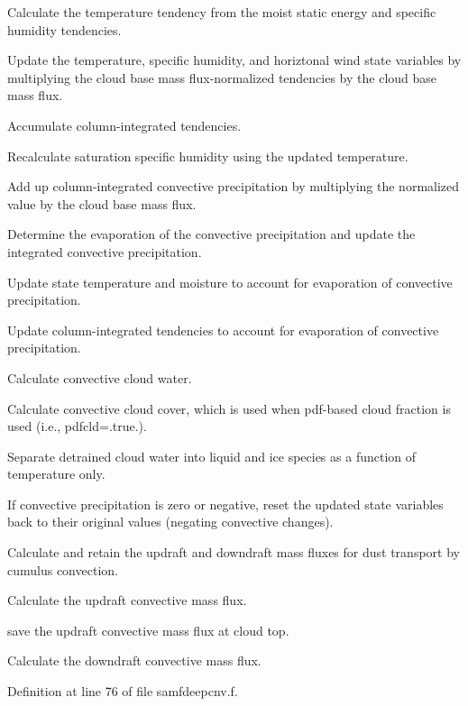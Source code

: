 \begin{DoxyItemize}
\item Calculate the temperature tendency from the moist static energy and specific humidity tendencies.
\item Update the temperature, specific humidity, and horiztonal wind state variables by multiplying the cloud base mass flux-\/normalized tendencies by the cloud base mass flux.
\item Accumulate column-\/integrated tendencies.
\item Recalculate saturation specific humidity using the updated temperature.
\item Add up column-\/integrated convective precipitation by multiplying the normalized value by the cloud base mass flux.
\item Determine the evaporation of the convective precipitation and update the integrated convective precipitation.
\item Update state temperature and moisture to account for evaporation of convective precipitation.
\item Update column-\/integrated tendencies to account for evaporation of convective precipitation.
\item Calculate convective cloud water.
\item Calculate convective cloud cover, which is used when pdf-\/based cloud fraction is used (i.\+e., pdfcld=.true.).
\item Separate detrained cloud water into liquid and ice species as a function of temperature only.
\item If convective precipitation is zero or negative, reset the updated state variables back to their original values (negating convective changes).
\item Calculate and retain the updraft and downdraft mass fluxes for dust transport by cumulus convection.
\item Calculate the updraft convective mass flux.
\item save the updraft convective mass flux at cloud top.
\item Calculate the downdraft convective mass flux. 
\end{DoxyItemize}

Definition at line 76 of file samfdeepcnv.\+f.

